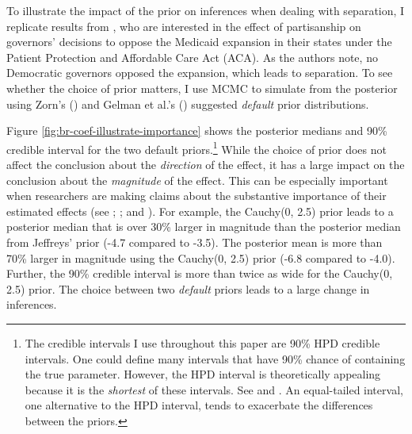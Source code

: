 \documentclass[12pt]{article}
\begin{document}
To illustrate the impact of the prior on inferences when dealing with separation, I replicate results from \cite{BarrilleauxRainey2014}, who are interested in the effect of partisanship on governors' decisions to oppose the Medicaid expansion in their states under the Patient Protection and Affordable Care Act (ACA).
As the authors note, no Democratic governors opposed the expansion, which leads to separation. 
To see whether the choice of prior matters, I use MCMC to simulate from the posterior using Zorn's (\citeyear{Zorn2005}) and Gelman et al.'s (\citeyear{Gelmanetal2008}) suggested \emph{default} prior distributions. 

Figure \ref{fig:br-coef-illustrate-importance} shows the posterior medians and 90\% credible interval for the two default priors.\footnote{
The credible intervals I use throughout this paper are 90\% HPD credible intervals. 
One could define many intervals that have 90\% chance of containing the true parameter.
 However, the HPD interval is theoretically appealing because it is the \emph{shortest} of these intervals. 
 See \citet[esp. pp. 48-51]{Gill2008} and \citet[esp. p. 448]{CasellaBerger2002}. 
 An equal-tailed interval, one alternative to the HPD interval, tends to exacerbate the differences between the priors.} 
 While the choice of prior does not affect the conclusion about the \emph{direction} of the effect, it has a large impact on the conclusion about the \emph{magnitude} of the effect. 
 This can be especially important when researchers are making claims about the substantive importance of their estimated effects (see \citealt{KingTomzWittenberg2000}; \citealt{Rainey2014a}; and \citealt{Gross2014}). 
 For example, the Cauchy(0, 2.5) prior leads to a posterior median that is over 30\% larger in magnitude than the posterior median from Jeffreys' prior (-4.7 compared to -3.5). 
 The posterior mean is more than 70\% larger in magnitude using the Cauchy(0, 2.5) prior (-6.8 compared to -4.0). 
 Further, the 90\% credible interval is more than twice as wide for the Cauchy(0, 2.5) prior. 
 The choice between two \emph{default} priors leads to a large change in inferences.
\end{document}

